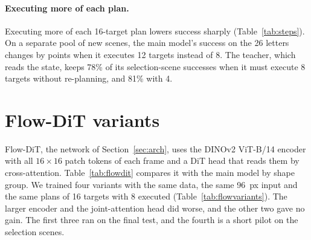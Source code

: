 \documentclass[10pt,twocolumn,letterpaper]{article}
\begin{document}
\paragraph{Executing more of each plan.}
Executing more of each 16-target plan lowers success sharply (Table~\ref{tab:steps}). On a separate pool of new scenes,
the main model's success on the 26 letters changes by \numStepsTwelveDiff{} points when it executes 12 targets
instead of 8. The
teacher, which reads the state, keeps 78\% of its selection-scene successes when it must execute 8 targets without
re-planning, and 81\% with 4.

\begin{table}[!htbp]
  \centering\small
  \caption{Targets executed of each 16-target plan before planning again. Main model on a separate pool of 200 new
  scenes per shape, paired by scene. The never-seen group has the six shapes of that test.}
  \label{tab:steps}
  
\end{table}

\section{Flow-DiT variants}
\label{sec:app-flow}

Flow-DiT, the network of Section~\ref{sec:arch}, uses the DINOv2 ViT-B/14 encoder with all $16\times16$ patch tokens of
each frame and a DiT head that reads them by cross-attention. Table~\ref{tab:flowdit} compares it with the main model
by shape group. We trained four variants with the same data, the same 96~px input and the same plans of 16 targets with
8 executed (Table~\ref{tab:flowvariants}). The larger encoder and the joint-attention head did worse, and the other two
gave no gain. The first three ran on the final test, and the fourth is a short pilot on the selection scenes.

\begin{table}[!htbp]
  \centering\small
  \caption{Flow-DiT compared with the main model on the final test. Success (\%) and the change in points with its
  95\% interval, paired by scene.}
  \label{tab:flowdit}
  
\end{table}
\end{document}
